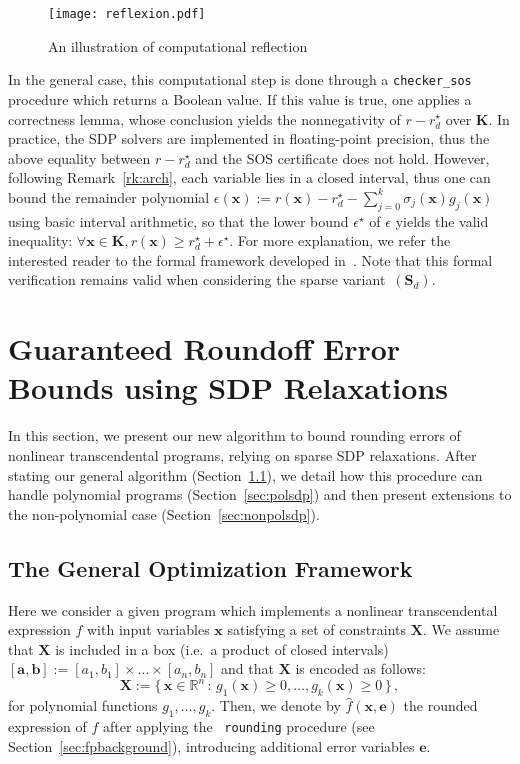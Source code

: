 \documentclass[preprint]{sigplanconf}
\newcommand{\code}[1]{\lstinline{#1}}
\newcommand{\R}{\mathbb{R}}
\newcommand{\x}{\mathbf{x}}
\newcommand{\e}{\mathbf{e}}
\renewcommand{\b}{\mathbf{b}}
\def\a{\mathbf{a}}
\def\S{\mathbf{S}}
\def\K{\mathbf{K}}
\def\S{\mathbf{S}}
\def\X{\mathbf{X}}
\theoremstyle{plain}
\begin{document}
\fi
%
\begin{figure}[!ht]
\centering
\texttt{[image: reflexion.pdf]}
\caption{An illustration of computational reflection}	
\label{fig:reflexion}
\end{figure}
%
In the general case, this computational step is done through a \code{checker_sos} procedure which returns a Boolean value. If this value is true, one applies a correctness lemma, whose conclusion yields the nonnegativity of $r - r_d^\star$ over $\K$.
In practice, the SDP solvers are implemented in floating-point precision, thus the above equality between $r - r_d^\star$ and the SOS certificate does not hold. However, following Remark~\ref{rk:arch}, each variable lies in a closed interval, thus one can bound the remainder polynomial $\epsilon(\x) := r(\x) - r_d^\star - \sum_{j=0}^k \sigma_j(\x) g_j(\x)$ using basic interval arithmetic, so that the lower bound $\epsilon^\star$ of $\epsilon$ yields the valid inequality: $\forall \x \in \K, r(\x) \geq r_d^\star + \epsilon^\star$.
For more explanation, we refer the interested reader to the formal framework developed in~\cite{jfr14}. Note that this formal verification remains valid when considering the sparse variant~$(\S_d)$.
%
\section{Guaranteed Roundoff Error Bounds using SDP Relaxations}
\label{sec:fpsdp}
In this section, we present our new algorithm to bound rounding errors of nonlinear transcendental programs, relying on sparse SDP relaxations. After stating our general algorithm (Section~\ref{sec:transcsdp}), we detail how this procedure can handle polynomial programs (Section~\ref{sec:polsdp}) and then present extensions to the non-polynomial case (Section~\ref{sec:nonpolsdp}).

\subsection{The General Optimization Framework}
\label{sec:transcsdp}
%
Here we consider a given program which implements a nonlinear transcendental expression $f$ with input variables $\x$ satisfying a set of constraints $\X$. We assume that  $\X$ is included in a box (i.e.~a product of closed intervals) $[\a, \b] := [a_1, b_1] \times \dots \times [a_n, b_n]$ and that $\X$ is encoded as follows: 
\[ 
\X := \{\, \x \in \R^n \, : \, g_1 (\x) \geq 0, \dots, g_{k} (\x) \geq 0 \,\} \,,
\]
for polynomial functions $g_1, \dots, g_k$. 
%
Then, we denote by $\hat{f}(\x,\e)$ the rounded expression of $f$ after applying the ~\lstinline|rounding| procedure (see Section~\ref{sec:fpbackground}), introducing additional error variables $\e$. 
\end{document}
